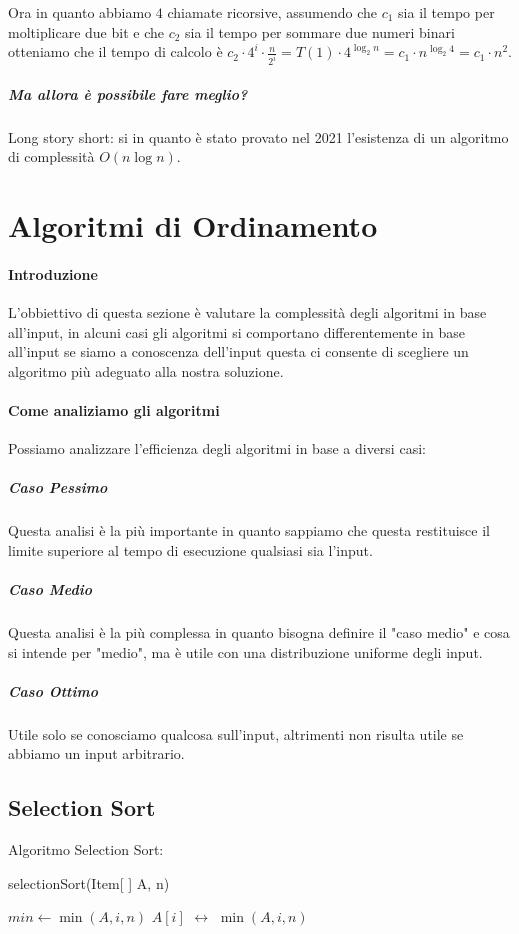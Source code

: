             Ora in quanto abbiamo $ 4 $ chiamate ricorsive, assumendo che $c_1$ sia il tempo per moltiplicare due bit e che $ c_2 $ sia il tempo per sommare due numeri binari otteniamo che il tempo di calcolo è $ c_2 \cdot 4^i \cdot \frac{n}{2^i} = T(1) \cdot 4^{\log_2 n} = c_1 \cdot n^{\log_2 4} = c_1 \cdot n^2 $.
            \subparagraph{Ma allora è possibile fare meglio?}
            Long story short: si in quanto è stato provato nel 2021 l'esistenza di un algoritmo di complessità $ O(n\log n) $. 
\section{Algoritmi di Ordinamento}
    \paragraph{Introduzione} L'obbiettivo di questa sezione è valutare la complessità degli algoritmi in base all'input, in alcuni casi gli algoritmi si comportano differentemente in base all'input se siamo a conoscenza dell'input questa ci consente di scegliere un algoritmo più adeguato alla nostra soluzione.
    \paragraph{Come analiziamo gli algoritmi}
        Possiamo analizzare l'efficienza degli algoritmi in base a diversi casi:
        \subparagraph{Caso Pessimo}
            Questa analisi è la più importante in quanto sappiamo che questa restituisce il limite superiore al tempo di esecuzione qualsiasi sia l'input.
        \subparagraph{Caso Medio}
            Questa analisi è la più complessa in quanto bisogna definire il "caso medio" e cosa si intende per "medio", ma è utile con una distribuzione uniforme degli input.
        \subparagraph{Caso Ottimo}
            Utile solo se conosciamo qualcosa sull'input, altrimenti non risulta utile se abbiamo un input arbitrario.
    \subsection{Selection Sort}
        Algoritmo Selection Sort:
        \begin{algorithm}
            \caption{selectionSort(Item[ ] A, \Int n)}\label{alg:selectionSort}
            \begin{algorithmic}[1]
                    \State \Int $min \gets \operatorname{min}(A,i,n)$
                    \State $A[i]$ $\leftrightarrow$ $\operatorname{min}(A,i,n) $
                \EndFor
            \end{algorithmic}
        \end{algorithm}

